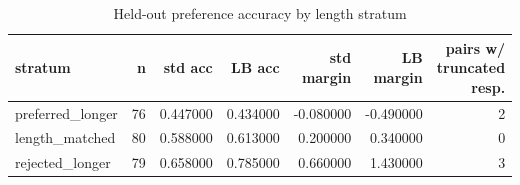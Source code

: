 \begin{table}
\caption{Held-out preference accuracy by length stratum}
\label{tab:t1_length_strata}
\begin{tabular}{lrrrrrr}
\toprule
stratum & n & std acc & LB acc & std margin & LB margin & pairs w/ truncated resp. \\
\midrule
preferred\_longer & 76 & 0.447000 & 0.434000 & -0.080000 & -0.490000 & 2 \\
length\_matched & 80 & 0.588000 & 0.613000 & 0.200000 & 0.340000 & 0 \\
rejected\_longer & 79 & 0.658000 & 0.785000 & 0.660000 & 1.430000 & 3 \\
\bottomrule
\end{tabular}
\end{table}
